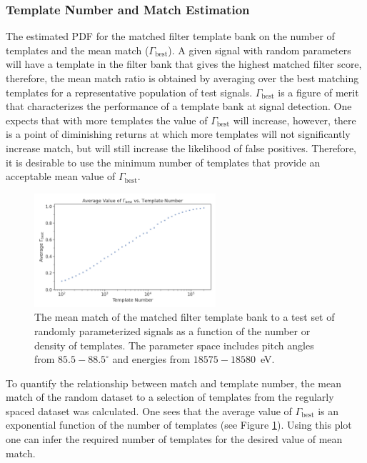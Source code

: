 \subsubsection{Template Number and Match Estimation}
The estimated PDF for the matched filter template bank on the number of templates and the mean match ($\Gamma_\mathrm{best}$). A given signal with random parameters will have a template in the filter bank that gives the highest matched filter score, therefore, the mean match ratio is obtained by averaging over the best matching templates for a representative population of test signals. $\Gamma_\mathrm{best}$ is a figure of merit that characterizes the performance of a template bank at signal detection. One expects that with more templates the value of $\Gamma_\mathrm{best}$ will increase, however, there is a point of diminishing returns at which more templates will not significantly increase match, but will still increase the likelihood of false positives. Therefore, it is desirable to use the minimum number of templates that provide an acceptable mean value of $\Gamma_\mathrm{best}$.
\begin{figure}[htbp]
    \centering
    \includegraphics[width=0.6\textwidth]{figs/Chapter-4/230426_mean_match_vs_templates.png}
    \caption{The mean match of the matched filter template bank to a test set of randomly parameterized signals as a function of the number or density of templates. The parameter space includes pitch angles from $85.5-88.5^\circ$ and energies from $18575-18580$~eV.}
    \label{fig:match_vs_template_number}
\end{figure}

To quantify the relationship between match and template number, the mean match of the random dataset to a selection of templates from the regularly spaced dataset was calculated. One sees that the average value of $\Gamma_\mathrm{best}$ is an exponential function of the number of templates (see Figure \ref{fig:match_vs_template_number}). Using this plot one can infer the required number of templates for the desired value of mean match.

